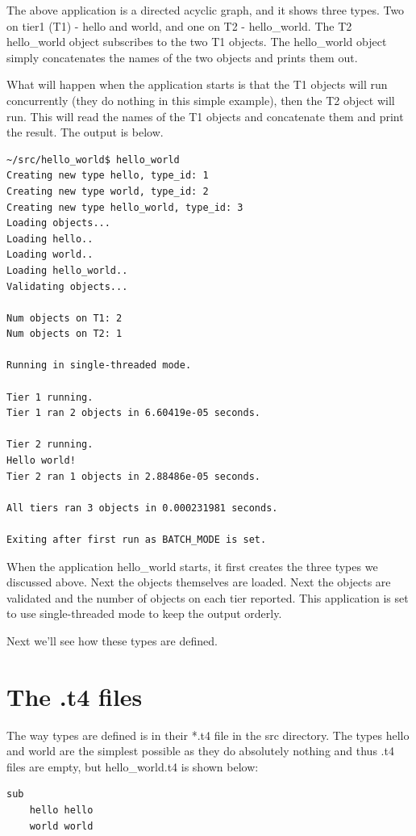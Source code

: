 \documentclass{report}
\begin{document}
The above application is a directed acyclic graph, and it shows three types. Two on tier1 (T1) - hello and world, and one on T2 - hello_world. The T2 hello_world object subscribes to the two T1 objects. The hello_world object simply concatenates the names of the two objects and prints them out.

What will happen when the application starts is that the T1 objects will run concurrently (they do nothing in this simple example), then the T2 object will run. This will read the names of the T1 objects and concatenate them and print the result. The output is below.


\begin{verbatim}
~/src/hello_world$ hello_world
Creating new type hello, type_id: 1
Creating new type world, type_id: 2
Creating new type hello_world, type_id: 3
Loading objects...
Loading hello..
Loading world..
Loading hello_world..
Validating objects...

Num objects on T1: 2
Num objects on T2: 1

Running in single-threaded mode.

Tier 1 running.
Tier 1 ran 2 objects in 6.60419e-05 seconds.

Tier 2 running.
Hello world!
Tier 2 ran 1 objects in 2.88486e-05 seconds.

All tiers ran 3 objects in 0.000231981 seconds.

Exiting after first run as BATCH_MODE is set.
\end{verbatim}

When the application hello_world starts, it first creates the three types we discussed above. Next the objects themselves are loaded. Next the objects are validated and the number of objects on each tier reported. This application is set to use single-threaded mode to keep the output orderly. 

Next we'll see how these types are defined.

\section{The .t4 files}

The way types are defined is in their *.t4 file in the src directory. The types hello and world are the simplest possible as they do absolutely nothing and thus .t4 files are empty, but hello_world.t4 is shown below:

\begin{verbatim}
sub
    hello hello
    world world
\end{verbatim}
\end{document}
